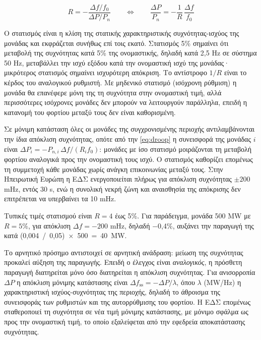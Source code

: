 \begin{equation}
R = -\frac{\Delta f / f_0}{\Delta P / P_n}
\qquad \Longleftrightarrow \qquad
\frac{\Delta P}{P_n} = -\frac{1}{R}\,\frac{\Delta f}{f_0}
\label{eq:droop}
\end{equation}

Ο στατισμός είναι η κλίση της στατικής χαρακτηριστικής συχνότητας-ισχύος της μονάδας και
εκφράζεται συνήθως επί τοις εκατό. Στατισμός 5\% σημαίνει ότι μεταβολή της συχνότητας κατά 5\%
της ονομαστικής, δηλαδή κατά 2,5 Hz σε σύστημα 50 Hz, μεταβάλλει την ισχύ εξόδου κατά την
ονομαστική ισχύ της μονάδας· μικρότερος στατισμός σημαίνει ισχυρότερη απόκριση. Το αντίστροφο
$1/R$ είναι το κέρδος του αναλογικού ρυθμιστή. Με μηδενικό στατισμό (ισόχρονη ρύθμιση) η
μονάδα θα επανέφερε μόνη της τη συχνότητα στην ονομαστική τιμή, αλλά περισσότερες ισόχρονες
μονάδες δεν μπορούν να λειτουργούν παράλληλα, επειδή η κατανομή του φορτίου μεταξύ τους δεν
είναι καθορισμένη.

Σε μόνιμη κατάσταση όλες οι μονάδες της συγχρονισμένης περιοχής αντιλαμβάνονται την ίδια
απόκλιση συχνότητας, οπότε από την \eqref{eq:droop} η συνεισφορά της μονάδας $i$ είναι
$\Delta P_i = -P_{n,i}\,\Delta f / (R_i f_0)$: μονάδες με ίσο στατισμό μοιράζονται τη
μεταβολή φορτίου αναλογικά προς την ονομαστική τους ισχύ. Ο στατισμός καθορίζει επομένως τη
συμμετοχή κάθε μονάδας χωρίς ανάγκη επικοινωνίας μεταξύ τους. Στην Ηπειρωτική Ευρώπη η ΕΔΣ
ενεργοποιείται πλήρως για απόκλιση συχνότητας $\pm 200$ mHz, εντός 30 s, ενώ η συνολική νεκρή
ζώνη και αναισθησία της απόκρισης δεν επιτρέπεται να υπερβαίνει τα 10 mHz.

Τυπικές τιμές στατισμού είναι $R = 4$ έως 5\%. Για παράδειγμα, μονάδα 500 MW με $R = 5\%$,
για απόκλιση $\Delta f = -200$ mHz, δηλαδή −0,4\%, αυξάνει την παραγωγή της κατά
(0,004~/~0,05)~×~500~=~40~MW.

Το αρνητικό πρόσημο αντιστοιχεί σε αρνητική ανάδραση: μείωση της συχνότητας προκαλεί αύξηση
της παραγωγής. Επειδή ο έλεγχος είναι \emph{αναλογικός}, η πρόσθετη παραγωγή διατηρείται μόνο
όσο διατηρείται η απόκλιση συχνότητας. Για ανισορροπία $\Delta P$ η απόκλιση μόνιμης
κατάστασης είναι $\Delta f_{\mathrm{ss}} = -\Delta P / \lambda$, όπου $\lambda$ (MW/Hz) η
χαρακτηριστική ισχύος-συχνότητας της περιοχής, δηλαδή το άθροισμα της συνεισφοράς των
ρυθμιστών και της αυτορρύθμισης του φορτίου. Η ΕΔΣ επομένως σταθεροποιεί τη συχνότητα σε
νέα τιμή μόνιμης κατάστασης, με μόνιμο σφάλμα ως προς την ονομαστική τιμή, το οποίο
εξαλείφεται από την εφεδρεία αποκατάστασης συχνότητας.

